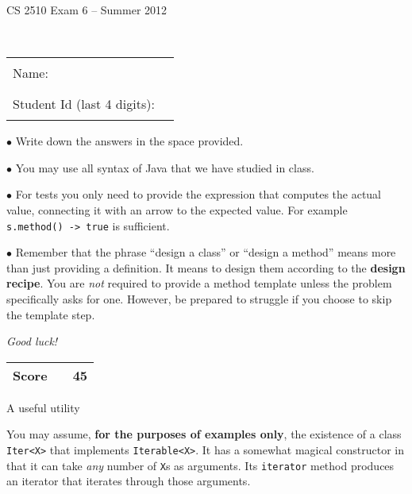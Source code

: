 \documentclass[11pt]{article}
\newcommand\code[1]{\texttt{#1}}
\newcounter{Pctr}
\begin{document}
\renewcommand{\theenumi}{\Alph{enumi}}
\setcounter{Pctr}{0}


\vfill
\centerline{\Large CS 2510 Exam 6 -- Summer 2012}

~\\[2cm]

\begin{center}
\begin{tabular}{l@{\qquad}l}
Name:                        & \rule{200pt}{.1pt} \\[.5cm]
Student Id (last 4 digits):  & \rule{200pt}{.1pt} \\[.5cm]
\end{tabular}
\end{center}

\noindent\begin{minipage}{7.5cm} $\bullet$ Write down the answers in the
space provided. 

$\bullet$ You may use all syntax of Java that we have studied in
class.

$\bullet$ For tests you only need to provide the expression that
computes the actual value, connecting it with an arrow to the expected
value. For example \code{s.method() -> true} is sufficient.

$\bullet$ Remember that the phrase ``design a class'' or ``design a
method'' means more than just providing a definition. It means to
design them according to the \textbf{design recipe}.  You are
\textit{not} required to provide a method template unless the problem
specifically asks for one.  However, be prepared to struggle if you
choose to skip the template step.

\bigskip

\textit{Good luck!}
\end{minipage}\hfil\begin{minipage}[t]{4.5cm}
\begin{tabular}{|c|l@{\qquad\qquad}|r|}
\hline
\textbf{Score} &  & 45 \\ \hline
\end{tabular}
\end{minipage}

\vfill\thispagestyle{empty}
\newpage

\begin{center}
A useful utility
\end{center}
You may assume, \textbf{for the purposes of examples only}, the existence of a
class {\tt Iter<X>} that implements {\tt Iterable<X>}.  It has a
somewhat magical constructor in that it can take \emph{any} number of
{\tt X}s as arguments.  Its {\tt iterator} method produces an iterator
that iterates through those arguments.
\end{document}
